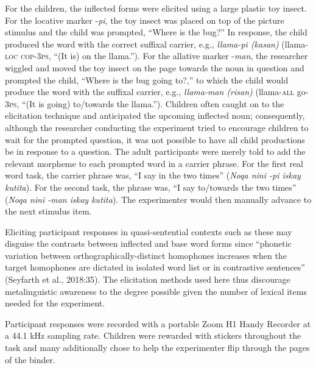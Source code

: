 \documentclass[a4paper,man,floatsintext,natbib,donotrepeattitle, apacite]{apa6}
\begin{document}
For the children, the inflected forms were elicited using a large plastic toy insect. For the locative marker -\textit{pi}, the toy insect was placed on top of the picture stimulus and the child was prompted, “Where is the bug?” In response, the child produced the word with the correct suffixal carrier, e.g., \textit{llama-pi (kasan)} (llama-\textsc{loc} \textsc{cop-3ps}, ``(It is) on the llama.''). For the allative marker -\textit{man}, the researcher wiggled and moved the toy insect on the page towards the noun in question and prompted the child, ``Where is the bug going to?,'' to which the child would produce the word with the suffixal carrier, e.g., \textit{llama-man (risan)} (llama-\textsc{all} go\textsc{-3ps}, ``(It is going) to/towards the llama.''). Children often caught on to the elicitation technique and anticipated the upcoming inflected noun; consequently, although the researcher conducting the experiment tried to encourage children to wait for the prompted question, it was not possible to have all child productions be in response to a question. The adult participants were merely told to add the relevant morpheme to each prompted word in a carrier phrase. For the first real word task, the carrier phrase was, ``I say in the \underline{\hspace{1cm}} two times'' (\textit{Noqa nini \underline{\hspace{1cm}}-pi iskay kutita}). For the second task, the phrase was, ``I say to/towards the \underline{\hspace{1cm}} two times'' (\textit{Noqa nini \underline{\hspace{1cm}}-man iskay kutita}). The experimenter would then manually advance to the next stimulus item. 

Eliciting participant responses in quasi-sentential contexts such as these may disguise the contrasts between inflected and base word forms since ``phonetic variation between orthographically-distinct homophones increases when the target homophones are dictated in isolated word list or in contrastive sentences'' (Seyfarth et al., 2018:35). The elicitation methods used here thus discourage metalinguistic awareness to the degree possible given the number of lexical items needed for the experiment.  

Participant responses were recorded with a portable Zoom H1 Handy Recorder at a 44.1 kHz sampling rate. Children were rewarded with stickers throughout the task and many additionally chose to help the experimenter flip through the pages of the binder.
\end{document}
